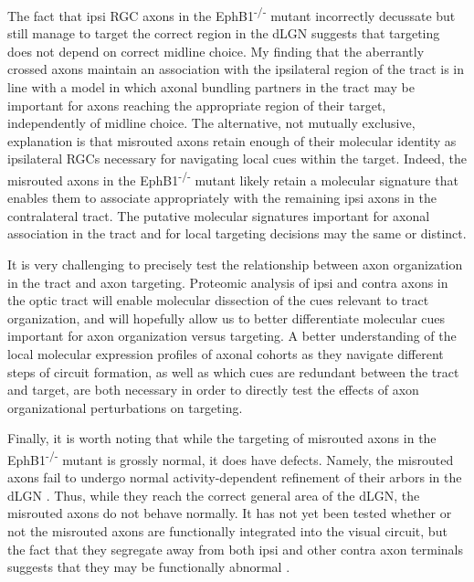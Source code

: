 The fact that ipsi RGC axons in the EphB1\textsuperscript{-/-} mutant incorrectly decussate but still manage to target the correct region in the dLGN suggests that targeting does not depend on correct midline choice.
My finding that the aberrantly crossed axons maintain an association with the ipsilateral region of the tract is in line with a model in which axonal bundling partners in the tract may be important for axons reaching the appropriate region of their target, independently of midline choice.
The alternative, not mutually exclusive, explanation is that misrouted axons retain enough of their molecular identity as ipsilateral RGCs necessary for navigating local cues within the target.
Indeed, the misrouted axons in the EphB1\textsuperscript{-/-} mutant likely retain a molecular signature that enables them to associate appropriately with the remaining ipsi axons in the contralateral tract.
The putative molecular signatures important for axonal association in the tract and for local targeting decisions may the same or distinct.

It is very challenging to precisely test the relationship between axon organization in the tract and axon targeting.
Proteomic analysis of ipsi and contra axons in the optic tract will enable molecular dissection of the cues relevant to tract organization, and will hopefully allow us to better differentiate molecular cues important for axon organization versus targeting.
A better understanding of the local molecular expression profiles of axonal cohorts as they navigate different steps of circuit formation, as well as which cues are redundant between the tract and target, are both necessary in order to directly test the effects of axon organizational perturbations on targeting.

Finally, it is worth noting that while the targeting of misrouted axons in the EphB1\textsuperscript{-/-} mutant is grossly normal, it does have defects.
Namely, the misrouted axons fail to undergo normal activity-dependent refinement of their arbors in the dLGN \cite{rebsam2009switching}.
Thus, while they reach the correct general area of the dLGN, the misrouted axons do not behave normally.
It has not yet been tested whether or not the misrouted axons are functionally integrated into the visual circuit, but the fact that they segregate away from both ipsi and other contra axon terminals suggests that they may be functionally abnormal \cite{rebsam2009switching}.

